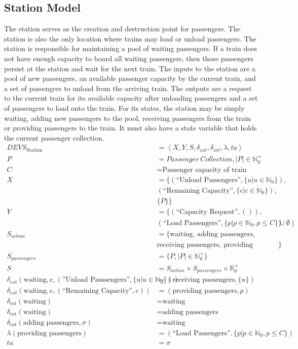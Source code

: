 \subsection{Station Model}
The station serves as the creation and destruction point for passengers.  The station is also the only location where trains may load or unload passengers. The station is responsible for maintaining a pool of waiting passengers.  If a train does not have enough capacity to board all waiting passengers, then those passengers persist at the station and wait for the next train.  The inputs to the station are a pool of new passengers, an available passenger capacity by the current train, and a set of passengers to unload from the arriving train.  The outputs are a request to the current train for its available capacity after unloading passengers and a set of passengers to load onto the train. For its states, the station may be simply waiting, adding new passengers to the pool, receiving passengers from the train or providing passengers to the train.  It must also have a state variable that holds the current passenger collection.
\begin{align*}
DEVS_{\textrm{Station}} &= \left<X,Y,S,\delta_{ext},\delta_{int},\lambda,ta\right> \\
P &= Passenger\ Collection, |P|\in\mathbb{N}_0^+ \\
C &= \text{Passenger capacity of train} \\
X &= \lbrace(\text{``Unload Passengers''},\lbrace u|u\in\mathbb{N}_0\rbrace), \\ & (\text{``Remaining Capacity''},\lbrace c|c\in\mathbb{N}_0\rbrace), \\ &\lbrace P\rbrace\rbrace \\
Y &= \lbrace(\text{``Capacity Request''},()), \\ & (\text{``Load Passengers''},\lbrace p|p\in\mathbb{N}_0,p\leq C\rbrace\cup \emptyset)\rbrace \\
S_{action} &= \lbrace\text{waiting, adding passengers}, \\ & \text{receiving passengers, providing passengers}\rbrace \\
S_{passengers} &= \lbrace P, |P|\in\mathbb{N}_0^+\rbrace \\
S &= S_{action}\times S_{passengers}\times \mathbb{R}_0^+ \\
\delta_{ext}(\text{waiting},e,(\text{''Unload Passsengers''},\lbrace u|u\in\mathbb{N}_0\rbrace)) &= (\text{receiving passengers},\lbrace u\rbrace) \\
\delta_{ext}(\text{waiting},e,(\text{``Remaining Capacity''},c)) &= (\text{providing passengers},p) \\
\delta_{int}(\text{waiting}) &= \text{waiting} \\
\delta_{int}(\text{waiting}) &= \text{adding passengers} \\
\delta_{int}(\text{adding passengers},\sigma) &= \text{waiting} \\
\lambda(\text{providing passengers}) &= (\text{``Load Passengers''},\lbrace p|p\in\mathbb{N}_0,p\leq C\rbrace) \\
ta &= \sigma \\
\end{align*}
%

